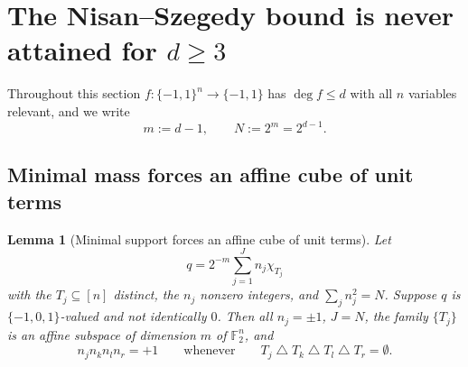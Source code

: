 \documentclass[11pt,reqno]{amsart}
\theoremstyle{plain}
\newtheorem{lemma}[theorem]{Lemma}
\theoremstyle{definition}
\numberwithin{theorem}{section}
\newcommand{\cube}{\{-1,1\}}
\newcommand{\bits}{\{-1,0,1\}}
\newcommand{\sd}{\mathbin{\triangle}}
\newcommand{\bbF}{\mathbb{F}}
\DeclareMathOperator{\Deg}{deg}
\begin{document}
\section{The Nisan--Szegedy bound is never attained for \texorpdfstring{$d \ge 3$}{d >= 3}}
\label{sec:ns}

Throughout this section $f \colon \cube^n \to \cube$ has $\Deg f \le d$ with all $n$ variables
relevant, and we write
\[
  m := d - 1, \qquad N := 2^m = 2^{d-1}.
\]

\subsection{Minimal mass forces an affine cube of unit terms}

\begin{lemma}[Minimal support forces an affine cube of unit terms]\label{lem:A}
Let
\[
  q = 2^{-m} \sum_{j=1}^{J} n_j \chi_{T_j}
\]
with the $T_j \subseteq [n]$ distinct, the $n_j$ nonzero integers, and $\sum_{j} n_j^2 = N$.
Suppose $q$ is $\bits$-valued and not identically $0$. Then all $n_j = \pm 1$, $J = N$, the
family $\{T_j\}$ is an affine subspace of dimension $m$ of $\bbF_2^n$, and
\[
  n_j n_k n_l n_r = +1 \qquad \text{whenever} \qquad T_j \sd T_k \sd T_l \sd T_r = \emptyset .
\]
\end{lemma}
\end{document}
